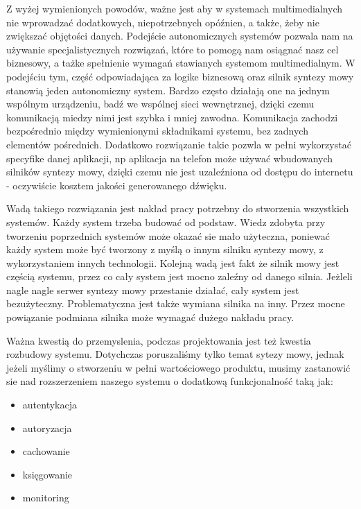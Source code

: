 Z wyżej wymienionych powodów, ważne jest aby w systemach multimedialnych nie wprowadzać dodatkowych, niepotrzebnych opóźnien, a także, żeby nie zwiększać objętości danych. Podejście autonomicznych systemów pozwala nam na używanie specjalistycznych rozwiązań, które to pomogą nam osiągnać nasz cel biznesowy, a tażke spełnienie wymagań stawianych systemom multimedialnym. W podejściu tym, część odpowiadająca za logike biznesową oraz silnik syntezy mowy stanowią jeden autonomiczny system. Bardzo często działają one na jednym wspólnym urządzeniu, badź we wspólnej sieci wewnętrznej, dzięki czemu komunikacją miedzy nimi jest szybka i mniej zawodna. Komunikacja zachodzi bezpośrednio między wymienionymi składnikami systemu, bez zadnych elementów pośrednich. Dodatkowo rozwiązanie takie pozwla w pełni wykorzystać specyfike danej aplikacji, np aplikacja na telefon może używać wbudowanych silników syntezy mowy, dzięki czemu nie jest uzaleźniona od dostępu do internetu - oczywiście  kosztem jakości generowanego dźwięku. 


Wadą takiego rozwiązania jest nakład pracy potrzebny do stworzenia wszystkich systemów. Każdy system trzeba budować od podstaw. Wiedz zdobyta przy tworzeniu poprzednich systemów może okazać sie mało użyteczna, poniewać każdy system może być tworzony z myślą o innym silniku syntezy mowy,  z wykorzystaniem innych technologii. Kolejną wadą jest fakt że silnik mowy jest częścią systemu, przez co cały system jest mocno zaleźny od danego silnia. Jeżleli nagle nagle serwer syntezy mowy przestanie działać, cały system jest bezużyteczny. Problematyczna jest także wymiana silnika na inny. Przez mocne powiązanie podmiana silnika może wymagać dużego nakładu pracy. 

Ważna kwestią do przemyslenia, podczas projektowania jest też kwestia rozbudowy systemu. Dotychczas poruszaliśmy tylko temat sytezy mowy,  jednak jeżeli myślimy o stworzeniu w pełni wartościowego produktu, musimy zastanowić sie nad rozszerzeniem naszego systemu o dodatkową funkcjonalność taką jak:

\begin{itemize}
	\item autentykacja
	\item autoryzacja
	\item cachowanie
	\item księgowanie
	\item monitoring
\end{itemize}

